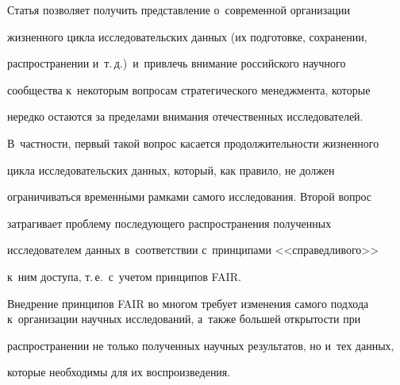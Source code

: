  

  Статья позволяет получить представление о~современной организации 

жизненного цикла исследовательских данных (их подготовке, сохранении, 

распространении и~т.\,д.)\ и~привлечь внимание российского научного 

сообщества к~некоторым вопросам стратегического менеджмента, которые 

нередко остаются за пределами внимания отечественных исследователей. 

В~част\-ности, первый такой вопрос касается продолжительности жизненного 

цикла исследовательских данных, который, как правило, не должен 

ограничиваться временн$\acute{\mbox{ы}}$ми рамками самого исследования. Второй вопрос 

затрагивает проблему последующего распространения полученных 

исследователем данных в~соответствии с~принципами <<справедливого>> 

к~ним доступа, т.\,е.\ с~учетом принципов FAIR.

  

  Внедрение принципов FAIR во многом требует изменения самого подхода к~организации научных исследований, а~также большей открытости при 

распространении не только полученных научных результатов, но и~тех данных, 

которые необходимы для их воспроизведения. 



